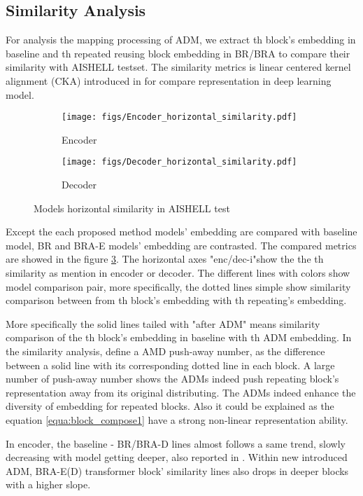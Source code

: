 \documentclass{INTERSPEECH2023}
\begin{document}
\subsection{Similarity Analysis}
For analysis the mapping processing of ADM, we extract th block's embedding in baseline and th repeated reusing block embedding in BR/BRA to compare their similarity with AISHELL testset. The similarity metrics is linear centered kernel alignment (CKA) introduced in \cite{kornblith2019similarity} for compare representation in deep learning model. 
\begin{figure}[t!]
    \centering
    \begin{subfigure}[b]{0.45\textwidth}
         \centering
         \texttt{[image: figs/Encoder\_horizontal\_similarity.pdf]}
         \caption{Encoder} \label{subfig:CKA_horizontal_encoder}
    \end{subfigure}
    \hfill
    \begin{subfigure}[b]{0.45\textwidth}
         \centering
         \texttt{[image: figs/Decoder\_horizontal\_similarity.pdf]}
         \caption{Decoder} \label{subfig:CKA_horizontal_decoder}
    \end{subfigure}
    \caption{Models horizontal similarity in AISHELL test}
    \label{fig:block_horizontal_CKA}
\end{figure}
Except the each proposed method models' embedding are compared with baseline model, BR and BRA-E models' embedding are contrasted. The compared metrics are showed in the figure \ref{fig:block_horizontal_CKA}. The horizontal axes "enc/dec-i"show the the th similarity as mention in encoder or decoder. The different lines with colors show model comparison pair, more specifically, the dotted lines simple show similarity comparison between from th block's embedding with th repeating's embedding. 


More specifically the solid lines tailed with "after ADM" means similarity comparison of the th block's embedding in baseline with th ADM embedding. In the similarity analysis, define a AMD push-away number, as the difference between a solid line with its corresponding dotted line in each block. A large number of push-away number shows the ADMs indeed push repeating block's representation away from its original distributing. The ADMs indeed enhance the diversity of embedding for repeated blocks. Also it could be explained as the  equation \ref{equa:block_compose1} have a strong non-linear representation ability.

In encoder, the baseline - BR/BRA-D lines almost follows a same trend, slowly decreasing with model getting deeper, also reported in \cite{lan2019albert}. Within new introduced ADM, BRA-E(D) transformer block' similarity lines also drops in deeper blocks with a higher slope. 
\end{document}
